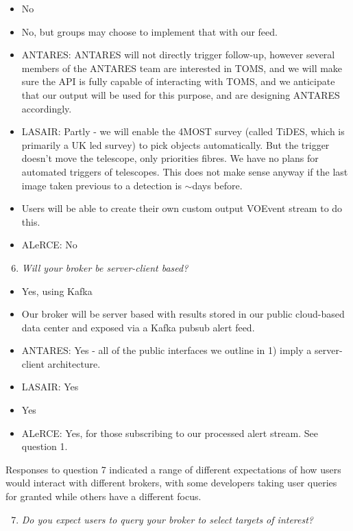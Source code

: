 \documentclass{article}
\begin{document}
\begin{itemize}
\item No
\item No, but groups may choose to implement that with our feed.
\item ANTARES: ANTARES will not directly trigger follow-up, however several members of the ANTARES team are interested in TOMS, and we will make sure the API is fully capable of interacting with TOMS, and we anticipate that our output will be used for this purpose, and are designing ANTARES accordingly. 
\item LASAIR: Partly - we will enable the 4MOST survey (called TiDES, which is primarily a UK led survey) to pick objects automatically. But the trigger doesn't move the telescope, only priorities fibres. We have no plans for automated triggers of telescopes. This does not make sense anyway if the last image taken previous to a detection is $\sim$days before.  
\item Users will be able to create their own custom output VOEvent stream to do this.
\item ALeRCE: No
\end{itemize}

\begin{enumerate}
\setcounter{enumi}{5}
\item {\em Will your broker be server-client based?}
\end{enumerate}

\begin{itemize}
\item Yes, using Kafka
\item Our broker will be server based with results stored in our public cloud-based data center and exposed via a Kafka pubsub alert feed.
\item ANTARES: Yes - all of the public interfaces we outline in 1) imply a server-client architecture. 
\item LASAIR: Yes
\item Yes
\item ALeRCE: Yes, for those subscribing to our processed alert stream. See question 1.
\end{itemize}

Responses to question 7 indicated a range of different expectations of how users would interact with different brokers, with some developers taking user queries for granted while others have a different focus. 

\begin{enumerate}
\setcounter{enumi}{6}
\item {\em Do you expect users to query your broker to select targets of interest?}
\end{enumerate}
\end{document}
